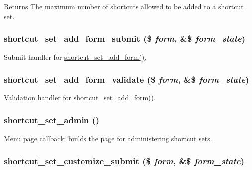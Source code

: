 \begin{DoxyReturn}{Returns}
The maximum number of shortcuts allowed to be added to a shortcut set. 
\end{DoxyReturn}
\hypertarget{shortcut_8admin_8inc_ad472e8cf443ae585c10ba86a12d7147b}{
\subsubsection[{shortcut\_\-set\_\-add\_\-form\_\-submit}]{\setlength{\rightskip}{0pt plus 5cm}shortcut\_\-set\_\-add\_\-form\_\-submit (\$ {\em form}, \/  \&\$ {\em form\_\-state})}}
\label{shortcut_8admin_8inc_ad472e8cf443ae585c10ba86a12d7147b}
Submit handler for \hyperlink{group__forms_ga7c3cd4fdbb8948463aab7769fc5e07b8}{shortcut\_\-set\_\-add\_\-form()}. \hypertarget{shortcut_8admin_8inc_a7148e2c08e32e220522d92a113b63f0e}{
\subsubsection[{shortcut\_\-set\_\-add\_\-form\_\-validate}]{\setlength{\rightskip}{0pt plus 5cm}shortcut\_\-set\_\-add\_\-form\_\-validate (\$ {\em form}, \/  \&\$ {\em form\_\-state})}}
\label{shortcut_8admin_8inc_a7148e2c08e32e220522d92a113b63f0e}
Validation handler for \hyperlink{group__forms_ga7c3cd4fdbb8948463aab7769fc5e07b8}{shortcut\_\-set\_\-add\_\-form()}. \hypertarget{shortcut_8admin_8inc_aca3f7ce7ccc572bccbfc8c130ac27151}{
\subsubsection[{shortcut\_\-set\_\-admin}]{\setlength{\rightskip}{0pt plus 5cm}shortcut\_\-set\_\-admin ()}}
\label{shortcut_8admin_8inc_aca3f7ce7ccc572bccbfc8c130ac27151}
Menu page callback: builds the page for administering shortcut sets. \hypertarget{shortcut_8admin_8inc_a913f637b897f5261c040b4d66f9448ff}{
\subsubsection[{shortcut\_\-set\_\-customize\_\-submit}]{\setlength{\rightskip}{0pt plus 5cm}shortcut\_\-set\_\-customize\_\-submit (\$ {\em form}, \/  \&\$ {\em form\_\-state})}}
